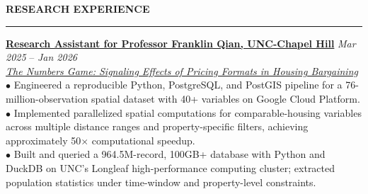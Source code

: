 \documentclass{../original_CV/resume}
\renewcommand{\sectionskip}{\vspace{0.10cm}}
\renewcommand{\sectionlineskip}{\vspace{0.10cm}}
\renewenvironment{rSection}[1]{
\sectionskip
\textcolor{UC San Diego Blue}{\textbf{\large\bfseries\MakeUppercase{#1}}}
\sectionlineskip
\hrule
\begin{list}{}{\setlength{\leftmargin}{0em}}
\item[]
}{\end{list}}
\begin{document}
\begin{rSection}{RESEARCH EXPERIENCE}
\noindent
\textbf{\href{https://github.com/YuankaiTao-super/Construction-of-Comparable-Housing-Variables}{Research Assistant for Professor Franklin Qian, UNC-Chapel Hill}} \hfill {\em Mar 2025} -- {\em Jan 2026}\\
\textit{\href{https://papers.ssrn.com/sol3/papers.cfm?abstract_id=4406954}{The Numbers Game: Signaling Effects of Pricing Formats in Housing Bargaining}}\\[3pt]
$\bullet$ Engineered a reproducible Python, PostgreSQL, and PostGIS pipeline for a 76-million-observation spatial dataset with 40+ variables on Google Cloud Platform.\\[1.5pt]
$\bullet$ Implemented parallelized spatial computations for comparable-housing variables across multiple distance ranges and property-specific filters, achieving approximately 50$\times$ computational speedup.\\[1.5pt]
$\bullet$ Built and queried a 964.5M-record, 100GB+ database with Python and DuckDB on UNC's Longleaf high-performance computing cluster; extracted population statistics under time-window and property-level constraints.
\end{rSection}
\end{document}
